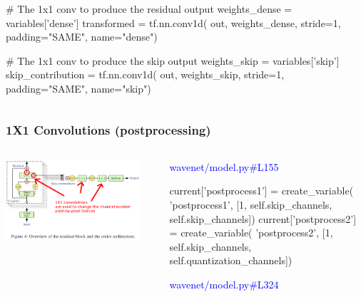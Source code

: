 \documentclass[8pt]{beamer}
\begin{document}
\begin{frame}[fragile]
\begin{columns}
\begin{column}{0.5\textwidth}
 \begin{verbnobox}[\tiny]
    # The 1x1 conv to produce the residual output
    weights_dense = variables['dense']
    transformed = tf.nn.conv1d(
        out, weights_dense, stride=1, padding="SAME", name="dense")

    # The 1x1 conv to produce the skip output
    weights_skip = variables['skip']
    skip_contribution = tf.nn.conv1d(
        out, weights_skip, stride=1, padding="SAME", name="skip")
\end{verbnobox}

\end{column}
\end{columns} 
 
\end{frame}

\begin{frame}[fragile]
\frametitle{1X1 Convolutions (postprocessing)}
\begin{columns}
\begin{column}{0.5\textwidth}
 
\includegraphics[width=0.9\textwidth]{./dl3_images/1x1_convolutions.png}

\end{column}
\begin{column}{0.5\textwidth}
 
 \textcolor{blue}{wavenet/model.py\#L155}
 
\begin{verbnobox}[\tiny]
    current['postprocess1'] = create_variable(
        'postprocess1',
        [1, self.skip_channels, self.skip_channels])
    current['postprocess2'] = create_variable(
        'postprocess2',
        [1, self.skip_channels, self.quantization_channels])
\end{verbnobox}

 \textcolor{blue}{wavenet/model.py\#L324}
 

\end{column}
\end{columns}
\end{frame}
\end{document}
